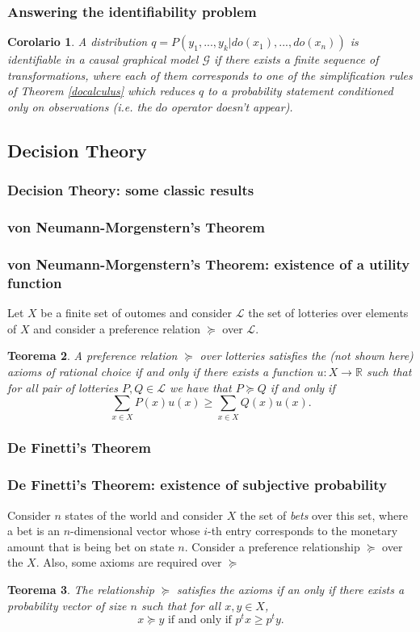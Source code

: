 \documentclass{beamer}
\theoremstyle{plain}
\newtheorem{teo}{Teorema}
\newtheorem{cor}[teo]{Corolario}
\begin{document}
		\begin{frame}
		\frametitle{Answering the identifiability problem}
		\begin{cor} 
		A distribution $q=P(y_1,...,y_k | do(x_1),...,do(x_n))$ is identifiable in a causal graphical model $\mathcal{G}$ if there exists a finite sequence of transformations, where each of them corresponds to one of the simplification rules of Theorem \ref{docalculus} which reduces $q$ to a probability statement conditioned only on observations (i.e. the $do$ operator doesn't appear).
\end{cor}
		\end{frame}
	\subsection{Decision Theory}
	\begin{frame}
	\frametitle{Decision Theory: some classic results}
	\end{frame}
		\subsubsection{von Neumann-Morgenstern's Theorem}
		\begin{frame}
		\frametitle{von Neumann-Morgenstern's Theorem: existence of a utility function}
		Let $X$ be a finite set of outomes and consider $\mathcal{L}$ the set of lotteries over elements of $X$ and consider a preference relation $\succeq$ over $\mathcal{L}$.
		\begin{teo}
		A preference relation $\succeq$ over lotteries satisfies the (not shown here) axioms of rational choice if and only if there exists a function $u: X \to \mathbb{R}$ such that for all pair of lotteries $P,Q \in \mathcal{L}$ we have that $P \succeq Q$ if and only if 
		\[ \sum_{x \in X} P(x) u(x) \geq \sum_{x \in X} Q(x) u(x).  \]
		\end{teo}
		\end{frame}
		\subsubsection{De Finetti's Theorem}
		\begin{frame}
		\frametitle{De Finetti's Theorem: existence of subjective probability}
		Consider $n$ states of the world and consider $X$ the set of \textit{bets} over this set, where a bet is an $n$-dimensional vector whose $i$-th entry corresponds to the monetary amount that is being bet on state $n$. Consider a preference relationship $\succeq$ over the $X$. Also, some axioms are required over $\succeq$
		\begin{teo}
		The relationship $\succeq$ satisfies the axioms if an only if there exists a probability vector of size $n$ such that for all $x,y \in X$,
		\[ x \succeq y \textrm { if and only if } p^t x \geq p^t y. \]
		\end{teo}
		\end{frame}
\end{document}

